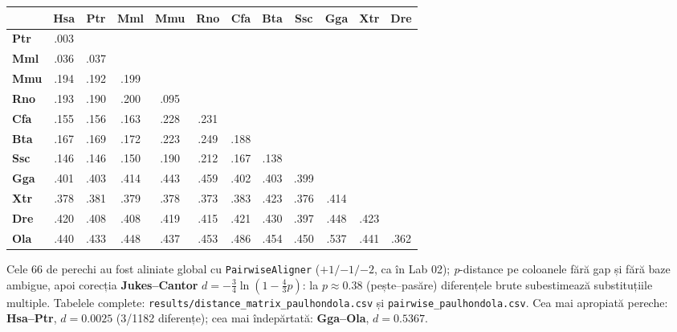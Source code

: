 \documentclass[10pt,a4paper]{article}
\newcommand{\taskheading}[1]{\vspace{3pt}{\normalsize\bfseries #1}\par\vspace{1pt}}
\begin{document}
\taskheading{Task 1 — Matrice de distanțe (3p)}
\begin{minipage}[t]{0.54\textwidth}\vspace{0pt}
\scriptsize
\begin{tabular}{l*{11}{c}}
\toprule
 & \textbf{Hsa} & \textbf{Ptr} & \textbf{Mml} & \textbf{Mmu} & \textbf{Rno} & \textbf{Cfa} & \textbf{Bta} & \textbf{Ssc} & \textbf{Gga} & \textbf{Xtr} & \textbf{Dre} \\ \midrule
\textbf{Ptr} & .003 &  &  &  &  &  &  &  &  &  &  \\
\textbf{Mml} & .036 & .037 &  &  &  &  &  &  &  &  &  \\
\textbf{Mmu} & .194 & .192 & .199 &  &  &  &  &  &  &  &  \\
\textbf{Rno} & .193 & .190 & .200 & .095 &  &  &  &  &  &  &  \\
\textbf{Cfa} & .155 & .156 & .163 & .228 & .231 &  &  &  &  &  &  \\
\textbf{Bta} & .167 & .169 & .172 & .223 & .249 & .188 &  &  &  &  &  \\
\textbf{Ssc} & .146 & .146 & .150 & .190 & .212 & .167 & .138 &  &  &  &  \\
\textbf{Gga} & .401 & .403 & .414 & .443 & .459 & .402 & .403 & .399 &  &  &  \\
\textbf{Xtr} & .378 & .381 & .379 & .378 & .373 & .383 & .423 & .376 & .414 &  &  \\
\textbf{Dre} & .420 & .408 & .408 & .419 & .415 & .421 & .430 & .397 & .448 & .423 &  \\
\textbf{Ola} & .440 & .433 & .448 & .437 & .453 & .486 & .454 & .450 & .537 & .441 & .362 \\
\bottomrule
\end{tabular}
\end{minipage}\hfill
\begin{minipage}[t]{0.44\textwidth}\vspace{0pt}\raggedright
Cele 66 de perechi au fost aliniate global cu \texttt{PairwiseAligner} ($+1/{-1}/{-2}$, ca în Lab 02); \emph{p}-distance pe coloanele fără gap și fără baze ambigue, apoi corecția \textbf{Jukes–Cantor} $d=-\tfrac34\ln(1-\tfrac43p)$: la $p\approx0.38$ (pește–pasăre) diferențele brute subestimează substituțiile multiple.
Tabelele complete: \texttt{results/distance\_matrix\_paulhondola.csv} și \texttt{pairwise\_paulhondola.csv}.
Cea mai apropiată pereche: \textbf{Hsa–Ptr}, $d=0.0025$ (3/1182 diferențe); cea mai îndepărtată: \textbf{Gga–Ola}, $d=0.5367$.
\end{minipage}
\end{document}
